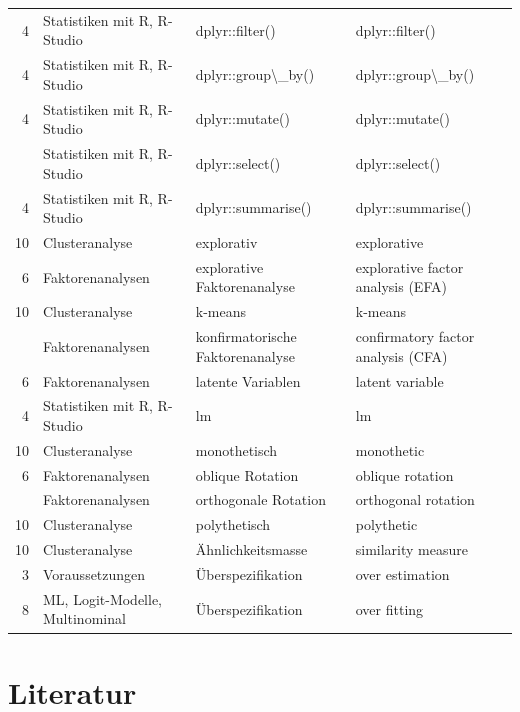 \documentclass[
  10pt,
  letterpaper,
  a4paper, twoside]{scrreprt}
\begin{document}
\begin{longtable*}{rlll}
4 & Statistiken mit R, R-Studio & dplyr::filter() & dplyr::filter()\\
4 & Statistiken mit R, R-Studio & dplyr::group\textbackslash{}\_by() & dplyr::group\textbackslash{}\_by()\\
4 & Statistiken mit R, R-Studio & dplyr::mutate() & dplyr::mutate()\\
 & Statistiken mit R, R-Studio & dplyr::select() & dplyr::select()\\
4 & Statistiken mit R, R-Studio & dplyr::summarise() & dplyr::summarise()\\
10 & Clusteranalyse & explorativ & explorative\\
6 & Faktorenanalysen & explorative Faktorenanalyse & explorative factor analysis (EFA)\\
10 & Clusteranalyse & k-means & k-means\\
 & Faktorenanalysen & konfirmatorische Faktorenanalyse & confirmatory factor analysis (CFA)\\
6 & Faktorenanalysen & latente Variablen & latent variable\\
4 & Statistiken mit R, R-Studio & lm & lm\\
10 & Clusteranalyse & monothetisch & monothetic\\
6 & Faktorenanalysen & oblique Rotation & oblique rotation\\
 & Faktorenanalysen & orthogonale Rotation & orthogonal rotation\\
10 & Clusteranalyse & polythetisch & polythetic\\
10 & Clusteranalyse & Ähnlichkeitsmasse & similarity measure\\
3 & Voraussetzungen & Überspezifikation & over estimation\\
8 & ML, Logit-Modelle, Multinominal & Überspezifikation & over fitting\\*
\end{longtable*}
\endgroup{}


\chapter*{Literatur}\label{literatur}



% 
\end{document}
